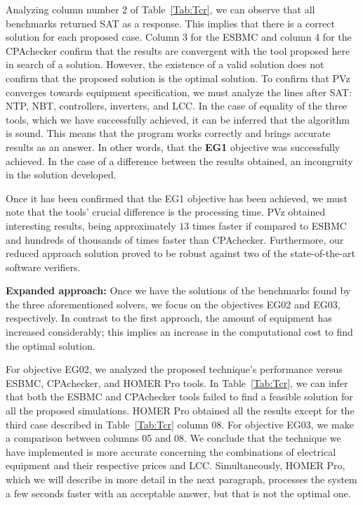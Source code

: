\documentclass[journal]{IEEEtran}
\begin{document}
Analyzing column number 2 of Table~\ref{Tab:Tcr}, we can observe that all benchmarks returned SAT as a response. This implies that there is a correct solution for each proposed case. Column 3 for the ESBMC and column 4 for the CPAchecker confirm that the results are convergent with the tool proposed here in search of a solution. However, the existence of a valid solution does not confirm that the proposed solution is the optimal solution. To confirm that PVz converges towards equipment specification, we must analyze the lines after SAT: NTP, NBT, controllers, inverters, and LCC. In the case of equality of the three tools, which we have successfully achieved, it can be inferred that the algorithm is sound. This means that the program works correctly and brings accurate results as an answer. In other words, that the \textbf{EG1} objective was successfully achieved. In the case of a difference between the results obtained, an incongruity in the solution developed.

Once it has been confirmed that the EG1 objective has been achieved, we must note that the tools' crucial difference is the processing time. PVz obtained interesting results, being approximately $13$ times faster if compared to ESBMC and hundreds of thousands of times faster than CPAchecker. Furthermore, our reduced approach solution proved to be robust against two of the state-of-the-art software verifiers.

\textbf{Expanded approach:} Once we have the solutions of the benchmarks found by the three aforementioned solvers, we focus on the objectives EG02 and EG03, respectively. In contrast to the first approach, the amount of equipment has increased considerably; this implies an increase in the computational cost to find the optimal solution.

For objective EG02, we analyzed the proposed technique's performance versus ESBMC, CPAchecker, and HOMER Pro tools. In Table~\ref{Tab:Tcr}, we can infer that both the ESBMC and CPAchecker tools failed to find a feasible solution for all the proposed simulations. HOMER Pro obtained all the results except for the third case described in Table~\ref{Tab:Tcr} column 08. For objective EG03, we make a comparison between columns 05 and 08. We conclude that the technique we have implemented is more accurate concerning the combinations of electrical equipment and their respective prices and LCC. Simultaneously, HOMER Pro, which we will describe in more detail in the next paragraph, processes the system a few seconds faster with an acceptable answer, but that is not the optimal one.
\end{document}
